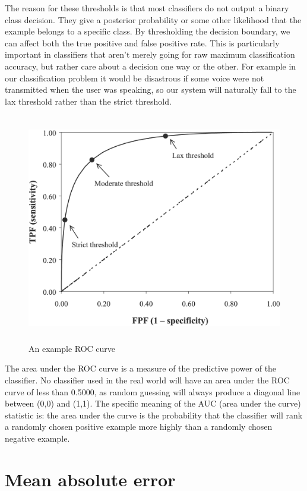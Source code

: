 \documentclass[ %
                    author={Sam Phippen},
                supervisor={Dr. Rafal Bogacz},
                     title={Real time voice activity detectors in noisy personal computing environments},
                  subtitle={},
                    degree={MEng},
                      year={2012} ]{thesis}
\begin{document}
The reason for these thresholds is that most classifiers do not output a binary
class decision. They give a posterior probability or some other likelihood that
the example belongs to a specific class. By thresholding the decision boundary,
we can affect both the true positive and false positive rate. This is
particularly important in classifiers that aren't merely going for raw maximum
classification accuracy, but rather care about a decision one way or the other.
For example in our classification problem it would be disastrous if some voice
were not transmitted when the user was speaking, so our system will naturally
fall to the lax threshold rather than the strict threshold.

\begin{figure}
    \begin{center}
        \includegraphics[height=10cm]{roc_example.png}
    \end{center}
    \caption{An example ROC curve}
    \label{fig:roc-example}
\end{figure}

The area under the ROC curve is a measure of the predictive power of the
classifier\cite{fawcett}. No classifier used in the real world will have an
area under the ROC curve of less than 0.5000, as random guessing will always
produce a diagonal line between (0,0) and (1,1). The specific meaning of the
AUC (area under the curve) statistic is: the area under the curve is the
probability that the classifier will rank a randomly chosen positive example
more highly than a randomly chosen negative example.

\section{Mean absolute error}
\end{document}
